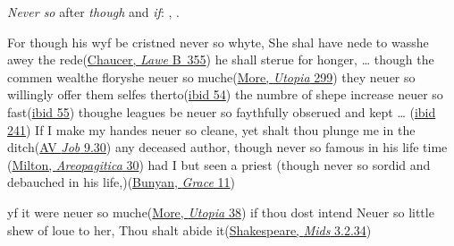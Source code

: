 \textit{Never so} after \textit{though} and \textit{if}: , .

\ea \label{ex:9-19}
\ea For though his wyf be cristned never so whyte, She shal have nede to wasshe awey the rede\hfill(\href{https://archive.org/details/completeworksofg04chauuoft/completeworksofg04chauuoft/page/140/mode/2up?q=%22wyf+be+cristned%22&view=theater}{Chaucer, \textit{Lawe} B~355})
\ex 
he shall sterue for honger, {\dots} though the commen wealthe floryshe neuer so muche\hfill(\href{https://archive.org/details/utopiasirthomas00robigoog/page/n409/mode/2up?q=%22sterue+for+honger%22&view=theater}{More, \textit{Utopia} 299}) %
\ex they neuer so willingly offer them selfes therto\hfill(\href{https://archive.org/details/utopiasirthomas00robigoog/page/n163/mode/2up?q=%22neuer+so+willingly%22&view=theater}{ibid 54}) %
\ex the numbre of shepe increase neuer so fast\hfill(\href{https://archive.org/details/utopiasirthomas00robigoog/page/n163/mode/2up?q=%22increase+neuer+so%22&view=theater}{ibid 55}) %
\ex thoughe leagues be neuer so faythfully obserued and kept {\dots} \hfill(\href{https://archive.org/details/utopiasirthomas00robigoog/page/n351/mode/2up?q=%22leagues+be+neuer+so%22&view=theater}{ibid 241}) %
\ex If I make my handes neuer so cleane, yet shalt thou plunge me in the ditch\hfill(\href{https://www.kingjamesbibleonline.org/1611_Job-9-30/}{AV \textit{Job} 9.30})
\ex any deceased author, though never so famous in his life time\\\hfill(\href{https://archive.org/details/areopagitica00miltuoft/page/32/mode/2up?q=%22any+deceased+author%22&view=theater}{Milton, \textit{Areopagitica} 30})
\ex had I but seen a priest (though never so sordid and debauched in his life,)\hfill(\href{https://archive.org/details/graceaboundingto00buny/page/14/mode/2up?q=%22seen+a+priest%22&view=theater}{Bunyan, \textit{Grace} 11}) %
\z
\z

\ea \label{ex:9-19a}
\ea yf it were neuer so muche\hfill(\href{https://archive.org/details/utopiasirthomas00robigoog/page/n147/mode/2up?q=%22were+neuer+so+muche%22&view=theater}{More, \textit{Utopia} 38})
\ex if thou dost intend Neuer so little shew of loue to her, Thou shalt abide it\hfill(\href{https://internetshakespeare.uvic.ca/doc/MND_F1/scene/3.2/index.html#tln-1370}{Shakespeare, \textit{Mids} 3.2.34})
\z
\z

